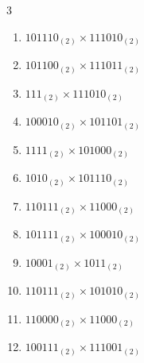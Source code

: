 \begin{multicols}{3}
\begin{enumerate}

  \item $101110_{(2)} \times 111010_{(2)}$


  \item $101100_{(2)} \times 111011_{(2)}$


  \item $111_{(2)} \times 111010_{(2)}$


  \item $100010_{(2)} \times 101101_{(2)}$


\columnbreak %

  \item $1111_{(2)} \times 101000_{(2)}$


  \item $1010_{(2)} \times 101110_{(2)}$


  \item $110111_{(2)} \times 11000_{(2)}$


  \item $101111_{(2)} \times 100010_{(2)}$


  \item $10001_{(2)} \times 1011_{(2)}$


\columnbreak %

\resetques

  \item $110111_{(2)} \times 101010_{(2)}$


  \item $110000_{(2)} \times 11000_{(2)}$


  \item $100111_{(2)} \times 111001_{(2)}$



\end{enumerate}
\end{multicols}
